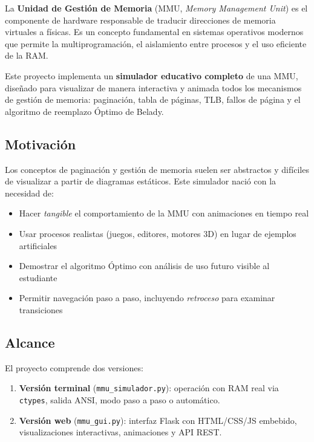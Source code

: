 \documentclass[12pt,a4paper]{article}
\begin{document}
La \textbf{Unidad de Gestión de Memoria} (MMU, \textit{Memory Management Unit}) es el componente
de hardware responsable de traducir direcciones de memoria virtuales a físicas. Es un concepto
fundamental en sistemas operativos modernos que permite la multiprogramación, el aislamiento entre
procesos y el uso eficiente de la RAM.

Este proyecto implementa un \textbf{simulador educativo completo} de una MMU, diseñado para
visualizar de manera interactiva y animada todos los mecanismos de gestión de memoria: paginación,
tabla de páginas, TLB, fallos de página y el algoritmo de reemplazo Óptimo de Belady.

\subsection{Motivación}

Los conceptos de paginación y gestión de memoria suelen ser abstractos y difíciles de visualizar
a partir de diagramas estáticos. Este simulador nació con la necesidad de:

\begin{itemize}[leftmargin=1.5cm]
  \item Hacer \textit{tangible} el comportamiento de la MMU con animaciones en tiempo real
  \item Usar procesos realistas (juegos, editores, motores 3D) en lugar de ejemplos artificiales
  \item Demostrar el algoritmo Óptimo con análisis de uso futuro visible al estudiante
  \item Permitir navegación paso a paso, incluyendo \textit{retroceso} para examinar transiciones
\end{itemize}

\subsection{Alcance}

El proyecto comprende dos versiones:
\begin{enumerate}[leftmargin=1.5cm]
  \item \textbf{Versión terminal} (\texttt{mmu\_simulador.py}): operación con RAM real via
        \texttt{ctypes}, salida ANSI, modo paso a paso o automático.
  \item \textbf{Versión web} (\texttt{mmu\_gui.py}): interfaz Flask con HTML/CSS/JS embebido,
        visualizaciones interactivas, animaciones y API REST.
\end{enumerate}
\end{document}
